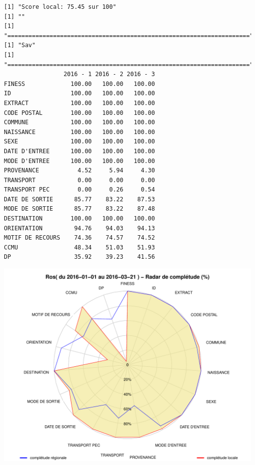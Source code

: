 \documentclass[]{article}
\begin{document}
\begin{verbatim}
[1] "Score local: 75.45 sur 100"
[1] ""
[1] "====================================================================="
[1] "Sav"
[1] "====================================================================="
                 2016 - 1 2016 - 2 2016 - 3
FINESS             100.00   100.00   100.00
ID                 100.00   100.00   100.00
EXTRACT            100.00   100.00   100.00
CODE POSTAL        100.00   100.00   100.00
COMMUNE            100.00   100.00   100.00
NAISSANCE          100.00   100.00   100.00
SEXE               100.00   100.00   100.00
DATE D'ENTREE      100.00   100.00   100.00
MODE D'ENTREE      100.00   100.00   100.00
PROVENANCE           4.52     5.94     4.30
TRANSPORT            0.00     0.00     0.00
TRANSPORT PEC        0.00     0.26     0.54
DATE DE SORTIE      85.77    83.22    87.53
MODE DE SORTIE      85.77    83.22    87.48
DESTINATION        100.00   100.00   100.00
ORIENTATION         94.76    94.03    94.13
MOTIF DE RECOURS    74.36    74.57    74.52
CCMU                48.34    51.03    51.93
DP                  35.92    39.23    41.56
\end{verbatim}

\includegraphics{completude_files/figure-latex/finess-11.pdf}
\end{document}
